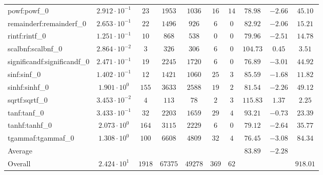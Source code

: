 \begin{tabular}{|l|c|c|c|c|c|c|c|c|c|}
powf:powf\_0                 & $ 2.912 \cdot 10^{-1} $ & $ 23     $ & $ 1953  $ & $ 1036  $ & $ 16  $ & $ 14 $ & $ 78.98       $ & $ -2.66   $ & $ 45.10   $ \\
remainderf:remainderf\_0     & $ 2.653 \cdot 10^{-1} $ & $ 22     $ & $ 1496  $ & $ 926   $ & $ 6   $ & $ 0  $ & $ 82.92       $ & $ -2.06   $ & $ 15.21   $ \\
rintf:rintf\_0               & $ 1.251 \cdot 10^{-1} $ & $ 10     $ & $ 868   $ & $ 538   $ & $ 0   $ & $ 0  $ & $ 79.96       $ & $ -2.51   $ & $ 14.78   $ \\
scalbnf:scalbnf\_0           & $ 2.864 \cdot 10^{-2} $ & $ 3      $ & $ 326   $ & $ 306   $ & $ 6   $ & $ 0  $ & $ 104.73      $ & $ 0.45    $ & $ 3.51    $ \\
significandf:significandf\_0 & $ 2.471 \cdot 10^{-1} $ & $ 19     $ & $ 2245  $ & $ 1720  $ & $ 6   $ & $ 0  $ & $ 76.89       $ & $ -3.01   $ & $ 44.92   $ \\
sinf:sinf\_0                 & $ 1.402 \cdot 10^{-1} $ & $ 12     $ & $ 1421  $ & $ 1060  $ & $ 25  $ & $ 3  $ & $ 85.59       $ & $ -1.68   $ & $ 11.82   $ \\
sinhf:sinhf\_0               & $ 1.901 \cdot 10^{0}  $ & $ 155    $ & $ 3633  $ & $ 2588  $ & $ 19  $ & $ 2  $ & $ 81.54       $ & $ -2.26   $ & $ 49.12   $ \\
sqrtf:sqrtf\_0               & $ 3.453 \cdot 10^{-2} $ & $ 4      $ & $ 113   $ & $ 78    $ & $ 2   $ & $ 3  $ & $ 115.83      $ & $ 1.37    $ & $ 2.25    $ \\
tanf:tanf\_0                 & $ 3.433 \cdot 10^{-1} $ & $ 32     $ & $ 2203  $ & $ 1659  $ & $ 29  $ & $ 4  $ & $ 93.21       $ & $ -0.73   $ & $ 23.39   $ \\
tanhf:tanhf\_0               & $ 2.073 \cdot 10^{0}  $ & $ 164    $ & $ 3115  $ & $ 2229  $ & $ 6   $ & $ 0  $ & $ 79.12       $ & $ -2.64   $ & $ 35.77   $ \\
tgammaf:tgammaf\_0           & $ 1.308 \cdot 10^{0}  $ & $ 100    $ & $ 6608  $ & $ 4809  $ & $ 32  $ & $ 4  $ & $ 76.45       $ & $ -3.08   $ & $ 84.34   $ \\
\hline
Average                      & $                     $ & $        $ & $       $ & $       $ & $     $ & $    $ & $ 83.89       $ & $ -2.28   $ & $         $ \\
\hline
Overall                      & $ 2.424 \cdot 10^{1}  $ & $ 1918   $ & $ 67375 $ & $ 49278 $ & $ 369 $ & $ 62 $ & $             $ & $         $ & $ 918.01  $ \\
\hline
\end{tabular}
